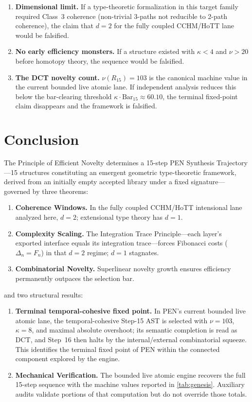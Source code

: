 \documentclass[11pt,a4paper]{article}
\theoremstyle{plain}
\theoremstyle{definition}
\theoremstyle{remark}
\begin{document}
\begin{enumerate}[nosep]
    \item \textbf{Dimensional limit.}
    If a type-theoretic formalization in this target family required Class~3 coherence (non-trivial 3-paths not reducible to 2-path coherence), the claim that $d = 2$ for the fully coupled CCHM/HoTT lane would be falsified.
    \item \textbf{No early efficiency monsters.}
    If a structure existed with $\kappa < 4$ and $\nu > 20$ before homotopy theory, the sequence would be falsified.
    \item \textbf{The DCT novelty count.}
    $\nu(R_{15}) = 103$ is the canonical machine value in the current bounded live atomic lane.
    If independent analysis reduces this below the bar-clearing threshold $\kappa \cdot \mathrm{Bar}_{15} \approx 60.10$, the terminal fixed-point claim disappears and the framework is falsified.
\end{enumerate}

\section{Conclusion}
\label{sec:conclusion}

The Principle of Efficient Novelty determines a 15-step PEN Synthesis Trajectory---15 structures constituting an emergent geometric type-theoretic framework, derived from an initially empty accepted library under a fixed signature---governed by three theorems:
\begin{enumerate}[nosep]
    \item \textbf{Coherence Windows.} In the fully coupled CCHM/HoTT intensional lane analyzed here, $d = 2$; extensional type theory has $d = 1$.
    \item \textbf{Complexity Scaling.} The Integration Trace Principle---each layer's exported interface equals its integration trace---forces Fibonacci costs ($\Delta_n = F_n$) in that $d = 2$ regime; $d = 1$ stagnates.
    \item \textbf{Combinatorial Novelty.} Superlinear novelty growth ensures efficiency permanently outpaces the selection bar.
\end{enumerate}
and two structural results:
\begin{enumerate}[nosep, start=4]
    \item \textbf{Terminal temporal-cohesive fixed point.} In PEN's current bounded live atomic lane, the temporal-cohesive Step-15 AST is selected with $\nu=103$, $\kappa=8$, and maximal absolute overshoot; its semantic completion is read as DCT, and Step~16 then halts by the internal/external combinatorial squeeze.
    This identifies the terminal fixed point of PEN within the connected component explored by the engine.
    \item \textbf{Mechanical Verification.} The bounded live atomic engine recovers the full 15-step sequence with the machine values reported in \cref{tab:genesis}. Auxiliary audits validate portions of that computation but do not override those totals.
\end{enumerate}
\end{document}
